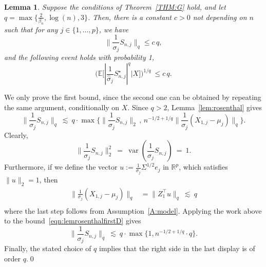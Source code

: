 \documentclass[aos,preprint]{imsart}
\numberwithin{equation}{section}
\theoremstyle{plain}
\newtheorem{lemma}{Lemma}[section]
\newcommand{\R}{\mathbb{R}}
\renewcommand{\hat}[1]{\widehat{#1}}
\newcommand{\E}{\mathbb{E}}
\newcommand{\var}{\operatorname{var}}
\newcommand{\ttop}{^{\top}}
\newcommand{\ts}{\textstyle}
\newcommand{\1}{{\bf{1}}}
\newcommand{\0}{\mathbf{0}}
\begin{document}
\begin{lemma}\label{lem:Snjnorm}
Suppose the conditions of Theorem~\ref{THM:G} hold, and let $q=\max\{\frac{2}{\beta_n}, \log(n),3\}$.
 Then, there is a constant $c>0$ not depending on $n$ such that for any $j\in\{1,\dots,p\}$, we have
\begin{equation}\label{eqn:firstsnjnorm}
\|\ts\frac{1}{\sigma_j}S_{n,j}\|_q \leq c\, q,
\end{equation}
and the following event holds with probability 1,
\begin{equation}
\Big(\E\big[|\ts\frac{1}{\hat \sigma_j}S_{n,j}^{\star}|^q|X\big] \Big)^{1/q} \ \leq c\, q.
\end{equation}
\end{lemma}
\proof We only prove the first bound, since the second one can be obtained by repeating the same argument, conditionally on $X$.
%
Since $q>2$, Lemma~\ref{lem:rosenthal} gives
\begin{equation}\label{eqn:lemrosenthalfirstD}
 \|\ts\frac{1}{\sigma_j}S_{n,j}\|_q \ \lesssim \ q\cdot \max\Big\{  \|\ts\frac{1}{\sigma_j}S_{n,j}\|_2 \, , \,  n^{-1/2+1/q} \|\ts\frac{1}{\sigma_j}(X_{1,j}-\mu_j)\|_q\Big\}.
\end{equation}
Clearly,
\begin{equation}
 \|\ts\frac{1}{\sigma_j}S_{n,j}\|_2^2 \ = \  \var(\ts\frac{1}{\sigma_j}S_{n,j}) \ = \ 1.
\end{equation}
Furthermore, if we define the vector $u:=\ts\frac{1}{\sigma_j}\Sigma^{1/2}e_j$ in $\R^p$, which satisfies $\|u\|_2=1$, then 
\begin{equation}
\begin{split}
\big\|\ts\frac{1}{\sigma_j}(X_{1,j}-\mu_j)\big\|_q
%
%
&=\big\| Z_1\ttop u\big\|_q \ \lesssim  \ q \\[0.2cm]
%
%
\end{split}
\end{equation}
where the last step  follows from Assumption~\ref{A:model}. Applying the work above to the bound~\eqref{eqn:lemrosenthalfirstD} gives
\begin{equation}
 \|\ts\frac{1}{\sigma_j}S_{n,j}\|_q \ \lesssim \ q\cdot \max\Big\{ 1, n^{-1/2+1/q}\cdot q\Big\}.
\end{equation}
Finally, the stated choice of $q$ implies that the right side in the last display is of order $q$.\qed
\end{document}
